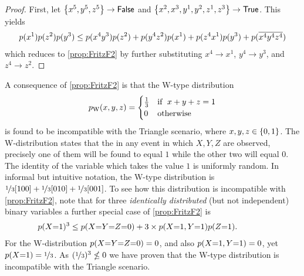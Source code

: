 \begin{proof}
First, let $\left\lbrace x^5,y^5,z^5\right\rbrace\to\mathsf{False}$ and $\left\lbrace x^2,x^3,y^1,y^2,z^1,z^3\right\rbrace\to\mathsf{True}$. This yields
\begin{align}
p\lparen x^1 \rparen p\lparen z^2\rparen p\lparen y^3\rparen
\leq
{p\lparen x^4 y^3\rparen p\lparen z^2\rparen
+p\lparen y^4 z^2\rparen p\lparen x^1\rparen
+p\lparen z^4 x^1\rparen p\lparen y^3\rparen
+p\lparen\ensuremath{\overline{x^4}} \ensuremath{\overline{y^4}} \ensuremath{\overline{z^4}}\rparen}
\end{align}
which reduces to \cref{prop:FritzF2} by further substituting $x^4\to x^1$, $y^4\to y^3$, and $z^4\to z^2$.
\end{proof}


A consequence of \cref{prop:FritzF2} is that the W-type distribution
\begin{align}\label{eq:wdistribution}
p_{\text{W}}\lparen x,y,z\rparen=\begin{cases}\tfrac{1}{3}&\text{if }\; x+y+z=1 \\ 0&\text{otherwise}\end{cases}
\end{align}
is found to be incompatible with the Triangle scenario, where $x,y,z\in\left\lbrace0,1\right\rbrace$. The W-distribution states that the in any event in which $X,Y,Z$ are observed, precisely one of them will be found to equal $1$ while the other two will equal $0$. The identity of the variable which takes the value $1$ is uniformly random. In informal but intuitive notation, the W-type distribution is ${\nicefrac{1}{3}[100]+\nicefrac{1}{3}[010]+\nicefrac{1}{3}[001]}$.
To see how this distribution is incompatible with \cref{prop:FritzF2}, note that for three \emph{identically distributed} (but not independent) binary variables a further special case of \cref{prop:FritzF2} is
\begin{align*}\begin{split}
&\hspace{-6ex}\p{X\cramp{=}1}^3\leq \p{X\cramp{=}Y\cramp{=}Z\cramp{=}0} + 3\times\p{X\cramp{=}1,Y\cramp{=}1}\p{Z\cramp{=}1}.
\end{split}\end{align*}
For the W-distribution ${p\lparen X\mathord{=}Y\mathord{=}Z\mathord{=}0\rparen=0}$, and also ${p\lparen X\mathord{=}1,Y\mathord{=}1\rparen=0}$, yet ${p\lparen X\mathord{=}1\rparen=\nicefrac{1}{3}}$. As ${(\nicefrac{1}{3})^3\nleq 0}$ we have proven that the W-type distribution is incompatible with the Triangle scenario.



